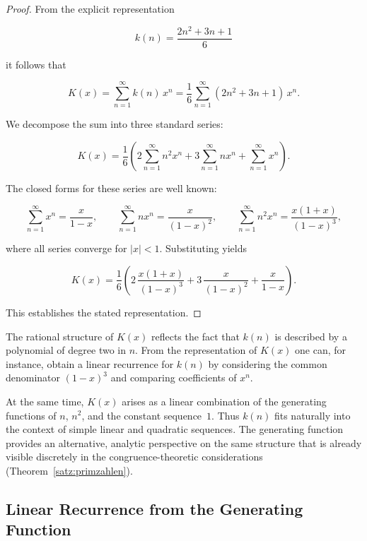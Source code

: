 \begin{proof}
From the explicit representation


\[
  k(n) = \frac{2n^{2} + 3n + 1}{6}
\]


it follows that


\[
  K(x)
  = \sum_{n=1}^{\infty} k(n)\,x^{n}
  = \frac{1}{6}\sum_{n=1}^{\infty} (2n^{2} + 3n + 1)\,x^{n}.
\]


We decompose the sum into three standard series:


\[
  K(x)
  = \frac{1}{6}\left(
      2\sum_{n=1}^{\infty} n^{2}x^{n}
      + 3\sum_{n=1}^{\infty} n x^{n}
      + \sum_{n=1}^{\infty} x^{n}
    \right).
\]


The closed forms for these series are well known:


\[
  \sum_{n=1}^{\infty} x^{n} = \frac{x}{1-x}, \qquad
  \sum_{n=1}^{\infty} n x^{n} = \frac{x}{(1-x)^{2}}, \qquad
  \sum_{n=1}^{\infty} n^{2} x^{n} = \frac{x(1+x)}{(1-x)^{3}},
\]


where all series converge for $|x|<1$. Substituting yields


\[
  K(x)
  = \frac{1}{6}\left(
      2\,\frac{x(1+x)}{(1-x)^{3}}
      + 3\,\frac{x}{(1-x)^{2}}
      + \frac{x}{1-x}
    \right).
\]


This establishes the stated representation.
\end{proof}

\begin{remark}
The rational structure of $K(x)$ reflects the fact that $k(n)$ is described
by a polynomial of degree two in $n$. From the representation of $K(x)$ one
can, for instance, obtain a linear recurrence for $k(n)$ by considering the
common denominator $(1-x)^{3}$ and comparing coefficients of $x^{n}$.

At the same time, $K(x)$ arises as a linear combination of the generating
functions of $n$, $n^{2}$, and the constant sequence~$1$. Thus $k(n)$ fits
naturally into the context of simple linear and quadratic sequences. The
generating function provides an alternative, analytic perspective on the same
structure that is already visible discretely in the congruence-theoretic
considerations (Theorem~\ref{satz:primzahlen}).
\end{remark}

\subsection{Linear Recurrence from the Generating Function}

